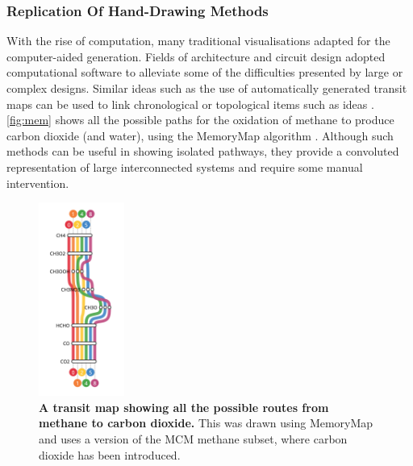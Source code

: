 \subsubsection{Replication Of Hand-Drawing Methods}\label{sec:handdrawn}
With the rise of computation, many traditional visualisations adapted for the computer-aided generation. Fields of architecture and circuit design adopted computational software to alleviate some of the difficulties presented by large or complex designs. Similar ideas such as the use of automatically generated transit maps can be used to link chronological or topological items such as ideas \citep{memory}. \autoref{fig:mem} shows all the possible paths for the oxidation of methane to produce carbon dioxide (and water), using the MemoryMap algorithm \cite{memory}. Although such methods can be useful in showing isolated pathways, they provide a convoluted representation of large interconnected systems and require some manual intervention. 


\begin{figure}[H]
     \centering
     \includegraphics[width=0.25\textwidth, angle=0]{figures_c1/layout/memory.png}
         \caption{\textbf{A transit map showing all the possible routes from methane to carbon dioxide.} This was drawn using MemoryMap \citep{memory} and uses a version of the MCM methane subset, where carbon dioxide has been introduced.}
        \label{fig:mem}
\end{figure}





